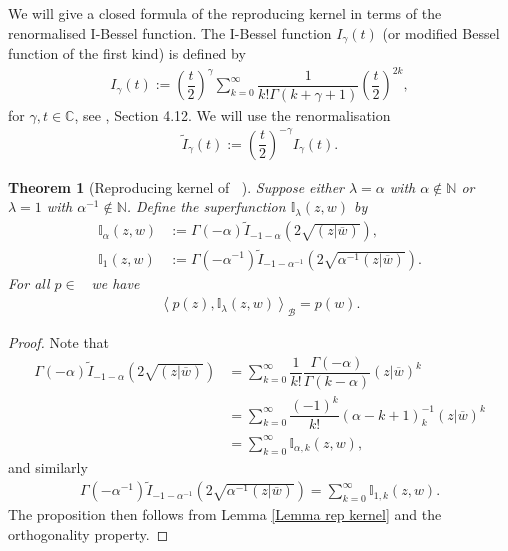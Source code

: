\documentclass{amsart}
\newtheorem{theorem}{Theorem}
\numberwithin{theorem}{section}
\theoremstyle{definition}
\theoremstyle{remark}
\def\N{\mathds{N} }
\def\C{\mathds{C} }
\DeclareMathOperator{\Fock}{\mc F_\lambda}
\newcommand{\bfip}[1]{\left<{#1}\right>_\mathcal B}
\newcommand{\ds}[1]{\mathds{#1}}
\newcommand{\mc}[1]{\mathcal{#1}}
\begin{document}
We will give a closed formula of the reproducing kernel in terms of the renormalised I-Bessel function. The I-Bessel function $I_\gamma(t)$ (or modified Bessel function of the first kind) is defined by
\begin{align*}
I_\gamma(t) := \left(\dfrac{t}{2}\right)^{\gamma}\sum_{k=0}^\infty \dfrac{1}{k!\Gamma(k+\gamma+1)}\left(\dfrac{t}{2}\right)^{2k},
\end{align*}
for $\gamma, t\in\C$, see \cite{AAR}, Section 4.12. We will use the renormalisation
\begin{align*}
\widetilde I_\gamma(t) := \left(\dfrac{t}{2}\right)^{-\gamma} I_\gamma(t).
\end{align*}

\begin{theorem}[Reproducing kernel of $\Fock$]\label{Theorem repr kernel}
Suppose either $\lambda=\alpha$ with $\alpha\not\in \N$ or $\lambda=1$ with $\alpha^{-1}\not\in \N$. Define the superfunction $\ds I_\lambda(z,w)$ by
\begin{align*}
\ds I_\alpha(z,w) &:= \Gamma(-\alpha)\widetilde I_{-1-\alpha}\left(2\sqrt{(z|\overline w)}\right),\\
\ds I_1(z,w) &:= \Gamma(-\alpha^{-1})\widetilde I_{-1-\alpha^{-1}}\left(2\sqrt{\alpha^{-1}(z|\overline w)}\right).
\end{align*}
For all $p\in \Fock$ we have
\begin{align*}
\bfip{p(z),\ds I_\lambda(z,w)} = p(w).
\end{align*}
\end{theorem}

\begin{proof}
Note that 
\begin{align*}
 \Gamma(-\alpha)\widetilde I_{-1-\alpha}\left(2\sqrt{(z|\overline w)}\right) &= \sum_{k=0}^\infty \dfrac{1}{k!}\dfrac{\Gamma(-\alpha)}{\Gamma(k-\alpha)}(z|\overline{w})^k  \\
&=  \sum_{k=0}^\infty \dfrac{(-1)^k}{k!}\left(\alpha-k+1\right)_k^{-1}(z|\overline{w})^k \\
&=\sum_{k=0}^\infty \ds I_{\alpha,k}(z,w), 
\end{align*}
and similarly
\begin{align*}
 \Gamma(-\alpha^{-1})\widetilde I_{-1-\alpha^{-1}}\left(2\sqrt{\alpha^{-1}(z|\overline w)}\right)=\sum_{k=0}^\infty \ds I_{1,k}(z,w) .
\end{align*}
The proposition then follows from Lemma \ref{Lemma rep kernel} and the orthogonality property.
\end{proof}
\end{document}
